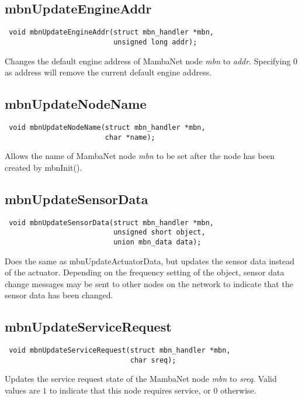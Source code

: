 \documentclass[a4paper]{report}
\begin{document}
\subsection{mbnUpdateEngineAddr}
\begin{verbatim}
 void mbnUpdateEngineAddr(struct mbn_handler *mbn,
                          unsigned long addr);
\end{verbatim}
Changes the default engine address of MambaNet node \textit{mbn} to \textit{addr}. Specifying $0$ as address will remove the current default engine address.


\subsection{mbnUpdateNodeName}
\begin{verbatim}
 void mbnUpdateNodeName(struct mbn_handler *mbn,
                        char *name);
\end{verbatim}
Allows the name of MambaNet node \textit{mbn} to be set after the node has been created by mbnInit().


\subsection{mbnUpdateSensorData}
\begin{verbatim}
 void mbnUpdateSensorData(struct mbn_handler *mbn,
                          unsigned short object,
                          union mbn_data data);
\end{verbatim}
Does the same as mbnUpdateActuatorData, but updates the sensor data instead of the actuator. Depending on the frequency setting of the object, sensor data change messages may be sent to other nodes on the network to indicate that the sensor data has been changed.


\subsection{mbnUpdateServiceRequest}
\begin{verbatim}
 void mbnUpdateServiceRequest(struct mbn_handler *mbn,
                              char sreq);
\end{verbatim}
Updates the service request state of the MambaNet node \textit{mbn} to \textit{sreq}. Valid values are $1$ to indicate that this node requires service, or $0$ otherwise.
\end{document}
